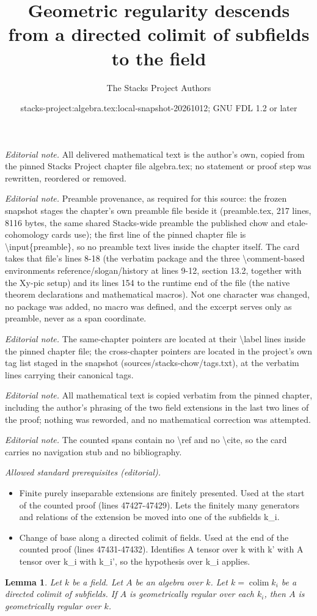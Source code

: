 \documentclass[10pt,a4paper]{amsart}
\title{Geometric regularity descends from a directed colimit of subfields to the field}
\author{The Stacks Project Authors}
\date{stacks-project:algebra.tex:local-snapshot-20261012; GNU FDL 1.2 or later}
\theoremstyle{plain}
\newtheorem{lemma}[subsection]{Lemma}
\theoremstyle{definition}
\theoremstyle{remark}
\numberwithin{equation}{subsection}
\def\colim{\mathop{\mathrm{colim}}\nolimits}
\begin{document}
\maketitle
\noindent\textit{Editorial note.} All delivered mathematical text is the author's own, copied from the pinned Stacks Project chapter file algebra.tex; no statement or proof step was rewritten, reordered or removed.\par\medskip
\noindent\textit{Editorial note.} Preamble provenance, as required for this source: the frozen snapshot stages the chapter's own preamble file beside it (preamble.tex, 217 lines, 8116 bytes, the same shared Stacks-wide preamble the published chow and etale-cohomology cards use); the first line of the pinned chapter file is \textbackslash{}input\{preamble\}, so no preamble text lives inside the chapter itself. The card takes that file's lines 8-18 (the verbatim package and the three \textbackslash{}comment-based environments reference/slogan/history at lines 9-12, section 13.2, together with the Xy-pic setup) and its lines 154 to the runtime end of the file (the native theorem declarations and mathematical macros). Not one character was changed, no package was added, no macro was defined, and the excerpt serves only as preamble, never as a span coordinate.\par\medskip
\noindent\textit{Editorial note.} The same-chapter pointers are located at their \textbackslash{}label lines inside the pinned chapter file; the cross-chapter pointers are located in the project's own tag list staged in the snapshot (sources/stacks-chow/tags.txt), at the verbatim lines carrying their canonical tags.\par\medskip
\noindent\textit{Editorial note.} All mathematical text is copied verbatim from the pinned chapter, including the author's phrasing of the two field extensions in the last two lines of the proof; nothing was reworded, and no mathematical correction was attempted.\par\medskip
\noindent\textit{Editorial note.} The counted spans contain no \textbackslash{}ref and no \textbackslash{}cite, so the card carries no navigation stub and no bibliography.\par\medskip
\noindent\textit{Allowed standard prerequisites (editorial).}\begin{itemize}
\item Finite purely inseparable extensions are finitely presented. Used at the start of the counted proof (lines 47427-47429). Lets the finitely many generators and relations of the extension be moved into one of the subfields k\_i.
\item Change of base along a directed colimit of fields. Used at the end of the counted proof (lines 47431-47432). Identifies A tensor over k with k' with A tensor over k\_i with k\_i', so the hypothesis over k\_i applies.
\end{itemize}\medskip
\begin{lemma}
\label{lemma-geometrically-regular-over-subfields}
Let $k$ be a field. Let $A$ be an algebra over $k$.
Let $k = \colim k_i$ be a directed colimit of subfields.
If $A$ is geometrically regular over each $k_i$, then
$A$ is geometrically regular over $k$.
\end{lemma}
\end{document}
